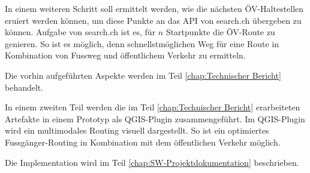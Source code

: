 In einem weiteren Schritt soll ermittelt werden, wie die nächsten ÖV-Haltestellen eruiert werden können, um diese Punkte an das \ac{API} von search.ch \cite{search_ch_route_api} übergeben zu können. Aufgabe von search.ch ist es, für $n$ Startpunkte die ÖV-Route zu genieren. So ist es möglich, denn schnellstmöglichen Weg für eine Route in Kombination von Fussweg und öffentlichem Verkehr zu ermitteln.

Die vorhin aufgeführten Aspekte werden im Teil \ref{chap:Technischer Bericht} behandelt.

In einem zweiten Teil werden die im Teil \ref{chap:Technischer Bericht} erarbeiteten Artefakte in einem Prototyp als QGIS-Plugin zusammengeführt. Im QGIS-Plugin wird ein multimodales Routing visuell dargestellt. So ist ein optimiertes Fussgänger-Routing in Kombination mit dem öffentlichen Verkehr möglich.

Die Implementation wird im Teil \ref{chap:SW-Projektdokumentation} beschrieben.
